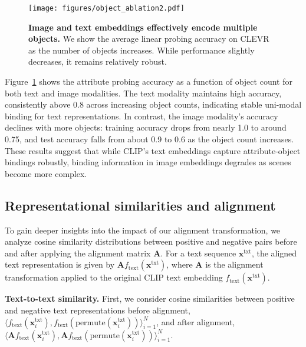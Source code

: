  
\begin{figure}[h] 
  \centering
  \vspace{-1em}
   \texttt{[image: figures/object\_ablation2.pdf]}
   \vspace{-2em}
   \caption{\textbf{Image and text embeddings effectively encode multiple objects.} We show the average linear probing accuracy on CLEVR as the number of objects increases. While performance slightly decreases, it remains relatively robust.} %
   \label{fig:object_ablation}
\end{figure}


Figure~\ref{fig:object_ablation} shows the attribute probing accuracy as a function of object count for both text and image modalities. The text modality maintains high accuracy, consistently above 0.8 across increasing object counts, indicating stable uni-modal binding for text representations. In contrast, the image modality’s accuracy declines with more objects: training accuracy drops from nearly 1.0 to around 0.75, and test accuracy falls from about 0.9 to 0.6 as the object count increases. These results suggest that while CLIP’s text embeddings capture attribute-object bindings robustly, binding information in image embeddings degrades as scenes become more complex. 




\subsection{Representational similarities and alignment} 


To gain deeper insights into the impact of our alignment transformation, we analyze cosine similarity distributions between positive and negative pairs before and after applying the alignment matrix \( \mathbf{A} \). For a text sequence \( \mathbf{x}^{\text{txt}} \), the aligned text representation is given by \( \mathbf{A} f_{\text{text}}(\mathbf{x}^{\text{txt}}) \), where \( \mathbf{A} \) is the alignment transformation applied to the original CLIP text embedding \( f_{\text{text}}(\mathbf{x}^{\text{txt}}) \). 

\noindent
\textbf{Text-to-text similarity.} First, we consider cosine similarities between positive and negative text representations before alignment, \(\langle f_{\text{text}}(\mathbf{x}_i^{\text{txt}}), f_{\text{text}}(\text{permute}(\mathbf{x}_i^{\text{txt}})) \rangle_{i=1}^N\), and after alignment, \(\langle \mathbf{A} f_{\text{text}}(\mathbf{x}_i^{\text{txt}}), \mathbf{A} f_{\text{text}}(\text{permute}(\mathbf{x}_i^{\text{txt}})) \rangle_{i=1}^N\). 

